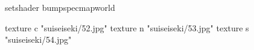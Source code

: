 setshader bumpspecmapworld

    texture c "suiseiseki/52.jpg"
    texture n "suiseiseki/53.jpg"
    texture s "suiseiseki/54.jpg"
